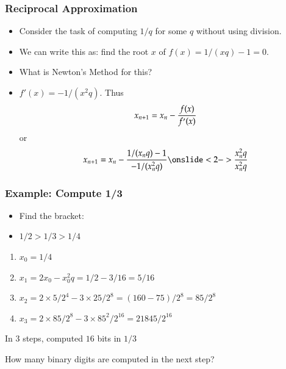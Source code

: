 \documentclass[10pt]{beamer}
\begin{document}
\begin{frame}
\frametitle{Reciprocal Approximation}
\begin{itemize}
  \item Consider the task of computing $1/q$ for some $q$ without
    using division.  
  \item We can write this as: find the root $x$ of $f(x) = 1/(xq)-1 =
    0$.
  \item What is Newton's Method for this?
  \item $f'(x) = -1/(x^2q)$.  Thus
  \begin{equation*}
       x_{n+1} = x_n - {f(x)\over f'(x)}
  \end{equation*}
  or 
  \begin{equation*}
       x_{n+1} = x_n - { 1/(x_nq)-1\over -1/(x_n^2q) } \onslide<2->{{ x_n^2q\over x_n^2q }}
  \end{equation*}
\end{itemize}
\end{frame}
\begin{frame}
\frametitle{Example: Compute 1/3}

\begin{itemize}
  \item Find the bracket:
  \item $1/2 > 1/3 > 1/4$
\end{itemize}
\begin{enumerate}
\item $x_0 = 1/4$
\item $x_1 = 2 x_0 - x_0^2q = 1/2 - 3/16 = 5/16$
\item $x_2 = 2 \times 5/2^4 - 3 \times 25/2^8 = (160-75)/2^8=85/2^8$
\item $x_3 = 2 \times 85/2^8 - 3 \times 85^2/2^{16} = 21845/2^{16}$
\end{enumerate}
In $3$ steps, computed $16$ bits in $1/3$

\begin{alertblock}{}
How many binary digits are computed in the next step?
\end{alertblock}

\end{frame}
\end{document}
